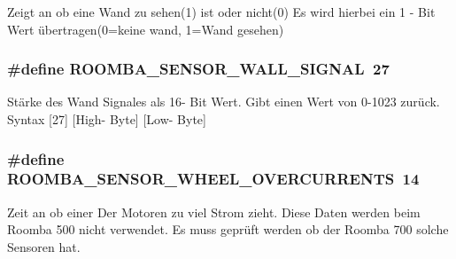 Zeigt an ob eine Wand zu sehen(1) ist oder nicht(0) Es wird hierbei ein 1 -\/ Bit Wert übertragen(0=keine wand, 1=Wand gesehen) \hypertarget{group__roomba__sensor__extern_ga5ee227b54819dd7bda9c0ceae020894f}{
\subsubsection[{R\-O\-O\-M\-B\-A\-\_\-\-S\-E\-N\-S\-O\-R\-\_\-\-W\-A\-L\-L\-\_\-\-S\-I\-G\-N\-A\-L}]{\setlength{\rightskip}{0pt plus 5cm}\#define R\-O\-O\-M\-B\-A\-\_\-\-S\-E\-N\-S\-O\-R\-\_\-\-W\-A\-L\-L\-\_\-\-S\-I\-G\-N\-A\-L~27}}\label{group__roomba__sensor__extern_ga5ee227b54819dd7bda9c0ceae020894f}
Stärke des Wand Signales als 16-\/ Bit Wert. Gibt einen Wert von 0-\/1023 zurück. Syntax \mbox{[}27\mbox{]} \mbox{[}High-\/ Byte\mbox{]} \mbox{[}Low-\/ Byte\mbox{]} \hypertarget{group__roomba__sensor__extern_gac75ea0b65c42e3d5743e942051b8bdd0}{
\subsubsection[{R\-O\-O\-M\-B\-A\-\_\-\-S\-E\-N\-S\-O\-R\-\_\-\-W\-H\-E\-E\-L\-\_\-\-O\-V\-E\-R\-C\-U\-R\-R\-E\-N\-T\-S}]{\setlength{\rightskip}{0pt plus 5cm}\#define R\-O\-O\-M\-B\-A\-\_\-\-S\-E\-N\-S\-O\-R\-\_\-\-W\-H\-E\-E\-L\-\_\-\-O\-V\-E\-R\-C\-U\-R\-R\-E\-N\-T\-S~14}}\label{group__roomba__sensor__extern_gac75ea0b65c42e3d5743e942051b8bdd0}
Zeit an ob einer Der Motoren zu viel Strom zieht. Diese Daten werden beim Roomba 500 nicht verwendet. Es muss geprüft werden ob der Roomba 700 solche Sensoren hat. 